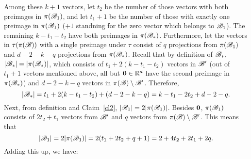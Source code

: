 \begin{enumerate}
\begin{enumerate}
\begin{enumerate}
                Among these $k+1$ vectors, let $t_2$ be the number of those vectors with both preimages in $\pi({\mathscr{B}}_1)$, and let $t_1+1$ be the number of those with exactly one preimage in $\pi({\mathscr{B}}_1)$ ($+1$ standning for the zero vector which belongs to  ${\mathscr{B}}_1$). The remaining $k-t_1-t_2$ have both preimages in $\pi({\mathscr{B}}_*)$. Furthermore, let the vectors in $\tau(\pi({\mathscr{B}}))$ with a single preimage under $\tau$ consist of $q$ projections from $\pi({\mathscr{B}}_1)$ and $d-2-k-q$ projections from $\pi({\mathscr{B}}_*)$. Recall that by definition of ${\mathscr{B}}_*$, $|{\mathscr{B}}_*| = |\pi({\mathscr{B}}_*)|$, which consists of  $t_1 + 2(k-t_1-t_2)$ vectors in ${\mathscr{B}}'$ (out of $t_1 + 1$ vectors mentioned above, all but $\mathbf{0}\in{\mathbb{R}}^d$ have the second preimage in $\pi({\mathscr{B}}_*)$) and $d-2-k-q$ vectors in $\pi({\mathscr{B}})\setminus {\mathscr{B}}'$. Therefore, 
                \[
                    |{\mathscr{B}}_*| = t_1 + 2(k-t_1-t_2) + (d-2-k-q) = k - t_1 - 2t_2 + d - 2 - q.
                \]
                Next, from definition and Claim~\ref{cl2}, $|{\mathscr{B}}_1|=2|\pi({\mathscr{B}}_1)|$. Besides $\mathbf{0}$, $\pi({\mathscr{B}}_1)$ consists of $2t_2+t_1$ vectors from ${\mathscr{B}}'$ and $q$ vectors from $\pi({\mathscr{B}})\setminus {\mathscr{B}}'$. This means that
                \[
                    |{\mathscr{B}}_1| = 2|\pi({\mathscr{B}}_1)| = 2(t_1 + 2t_2 + q + 1) = 2 + 4t_2 + 2t_1 + 2q.
                \]
                Adding this up, we have:
                 

\end{enumerate}
\end{enumerate}
\end{enumerate}
